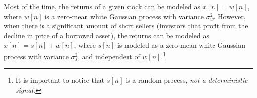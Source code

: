 \else


Most of the time, the returns of a given stock can be modeled as $x[n] = w[n]$, where $w[n]$ is a zero-mean white Gaussian process with variance $\sigma_w^2$. However, when there is a significant amount of short sellers (investors that profit from the decline in price of a borrowed asset), the returns can be modeled as $x[n] = s[n] + w[n]$, where $s[n]$ is modeled as a zero-mean white Gaussian process with variance $\sigma_s^2$, and independent of $w[n]$.\footnote{It is important to notice that $s[n]$ is a random process, \emph{not a deterministic signal.}}


